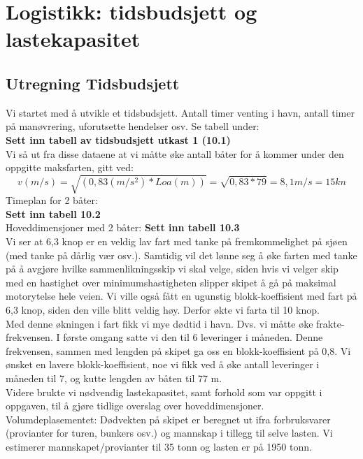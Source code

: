 \documentclass[norsk]{article}
\begin{document}
\section{Logistikk: tidsbudsjett og lastekapasitet}
	\subsection{Utregning Tidsbudsjett}	
Vi startet med å utvikle et tidsbudsjett. Antall timer venting i havn, antall timer på manøvrering, uforutsette hendelser osv. Se tabell under: \\

\textbf{Sett inn tabell av tidsbudsjett utkast 1 (10.1)} \\

Vi så ut fra disse dataene at vi måtte øke antall båter for å kommer under den oppgitte maksfarten, gitt ved: $$v(m/s)=\sqrt{(0,83(m/s^2)*Loa(m))}=\sqrt{0,83*79}=8,1m/s=15kn$$ Timeplan for 2 båter: \\
\textbf{Sett inn tabell 10.2} \\
Hoveddimensjoner med 2 båter: \textbf{Sett inn tabell 10.3} \\

Vi ser at 6,3 knop er en veldig lav fart med tanke på fremkommelighet på sjøen (med tanke på dårlig vær osv.). Samtidig vil det lønne seg å øke farten med tanke på å avgjøre hvilke sammenlikningsskip vi skal velge, siden hvis vi velger skip med en hastighet over minimumshastigheten slipper skipet å gå på maksimal motorytelse hele veien. Vi ville også fått en ugunstig blokk-koeffisient med fart på 6,3 knop, siden den ville blitt veldig høy. Derfor økte vi farta til 10 knop. \\

Med denne økningen i fart fikk vi mye dødtid i havn. Dvs. vi måtte øke frakte-frekvensen. I første omgang satte vi den til 6 leveringer i måneden.
Denne frekvensen, sammen med lengden på skipet ga oss en blokk-koeffisient på 0,8. Vi ønsket en lavere blokk-koeffisient, noe vi fikk ved å øke antall leveringer i måneden til 7, og kutte lengden av båten til 77 m. \\

Videre brukte vi nødvendig lastekapasitet, samt forhold som var oppgitt i oppgaven, til å gjøre tidlige overslag over hoveddimensjoner. \\

Volumdeplasementet:
Dødvekten på skipet er beregnet ut ifra forbruksvarer (provianter for turen, bunkers osv.) og mannskap i tillegg til selve lasten. Vi estimerer mannskapet/provianter til 35 tonn og lasten er på 1950 tonn. \\
\end{document}
